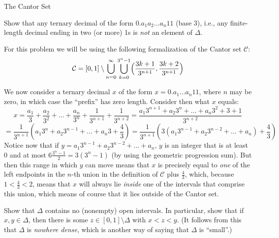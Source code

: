 \begin{section}{The Cantor Set}
    
\begin{exercise}{21}
    Show that any ternary decimal of the form $0.a_1 a_2 \ldots a_n 11$ (base 3), i.e., any finite-length decimal ending in two (or more) 1s is \textit{not} an element of $\Delta$.
\end{exercise}

\begin{solution}

    For this problem we will be using the following formalization of the Cantor set $\mathcal{C}$:
    $$\mathcal{C} = [0, 1] \setminus \bigcup_{n=0}^{\infty} \bigcup_{k=0}^{3^n - 1} \Bigl ( \frac{3k + 1}{3^{n+1}}, \frac{3k + 2}{3^{n+1}} \Bigr )$$

    We now consider a ternary decimal $x$ of the form $x = 0.a_1 \ldots a_n 1 1$, where $n$ may be zero, in which case the ``prefix'' has zero length. 
    Consider then what $x$ equals:
    $$x = \frac{a_1}{3} + \frac{a_2}{3^2} + \ldots +\frac{a_n}{3^n} + \frac{1}{3^{n+1}} + \frac{1}{3^{n+2}} = \frac{a_1 3^{n+1} + a_2 3^n + \ldots + a_n3^2 + 3 + 1}{3^{n+2}}$$
    $$= \frac{1}{3^{n+1}}(a_1 3^n + a_2 3^{n-1} + \ldots + a_n 3 + \frac{4}{3}) = \frac{1}{3^{n+1}}(3(a_1 3^{n-1} + a_2 3^{n-2} + \ldots + a_n) + \frac{4}{3})$$
    Notice now that if $y = a_1 3^{n-1} + a_2 3^{n-2} + \ldots + a_n$, $y$ is an integer that is at least 0 and at most $6\frac{3^n - 1}{2} = 3(3^n - 1)$ (by using the geometric progression sum).
    But then this range in which $y$ can move means that $x$ is precisely equal to \textit{one} of the left endpoints in the $n$-th union in the definition of $\mathcal{{C}}$ plus $\frac{4}{3}$, which, because $1 < \frac{4}{3} < 2$, means that $x$ will always lie \textit{inside} one of the intervals that comprise this union, which means of course that it lies outside of the Cantor set.
\end{solution}

\begin{exercise}{22}
    Show that $\Delta$ contains no (nonempty) open intervals.
    In particular, show that if $x, y \in \Delta$, then there is some $z \in [0, 1] \setminus \Delta$ with $x < z < y$. 
    (It follows from this that $\Delta$ is \textit{nowhere dense}, which is another way of saying that $\Delta$ is ``small''.)
\end{exercise}

\begin{solution}


\end{solution}
\end{section}
